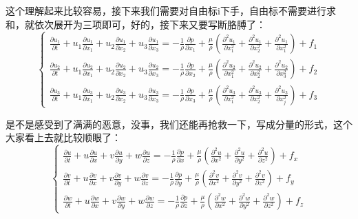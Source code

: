 \documentclass{ctexart}
\begin{document}
    \par
    这个理解起来比较容易，接下来我们需要对自由标i下手，自由标不需要进行求和，就依次展开为三项即可，好的，接下来又要写断胳膊了：
    $$
    \left\{\begin{array}{r}
    \frac{\partial u_{1}}{\partial t}+u_{1} \frac{\partial u_{1}}{\partial x_{1}}+u_{2} \frac{\partial u_{1}}{\partial x_{2}}+u_{3} \frac{\partial u_{1}}{\partial x_{3}}=-\frac{1}{\rho} \frac{\partial p}{\partial x_{1}}+\frac{\mu}{\rho}\left(\frac{\partial^{2} u_{1}}{\partial x_{1}^{2}}+\frac{\partial^{2} u_{1}}{\partial x_{2}^{2}}+\frac{\partial^{2} u_{1}}{\partial x_{1}^{2}}\right)+f_{1} \\
    \frac{\partial u_{2}}{\partial t}+u_{1} \frac{\partial u_{2}}{\partial x_{1}}+u_{2} \frac{\partial u_{2}}{\partial x_{2}}+u_{3} \frac{\partial u_{2}}{\partial x_{3}}=-\frac{1}{\rho} \frac{\partial p}{\partial x_{2}}+\frac{\mu}{\rho}\left(\frac{\partial^{2} u_{2}}{\partial x_{1}^{2}}+\frac{\partial^{2} u_{2}}{\partial x_{2}^{2}}+\frac{\partial^{2} u_{2}}{\partial x_{3}^{2}}\right)+f_{2} \\
    \frac{\partial u_{3}}{\partial t}+u_{1} \frac{\partial u_{3}}{\partial x_{1}}+u_{2} \frac{\partial u_{3}}{\partial x_{2}}+u_{3} \frac{\partial u_{3}}{\partial x_{3}}=-\frac{1}{\rho} \frac{\partial p}{\partial x_{3}}+\frac{\mu}{\rho}\left(\frac{\partial^{2} u_{3}}{\partial x_{1}^{2}}+\frac{\partial^{2} u_{3}}{\partial x_{2}^{2}}+\frac{\partial^{2} u_{3}}{\partial x_{j}^{2}}\right)+f_{3}
    \end{array}\right.
    $$
    \par
    是不是感受到了满满的恶意，没事，我们还能再抢救一下，写成分量的形式，这个大家看上去就比较顺眼了：
    $$
    \left\{\begin{array}{r}
    \frac{\partial u}{\partial t}+u \frac{\partial u}{\partial x}+v \frac{\partial u}{\partial y}+w \frac{\partial u}{\partial z}=-\frac{1}{\rho} \frac{\partial p}{\partial x}+\frac{\mu}{\rho}\left(\frac{\partial^{2} u}{\partial x^{2}}+\frac{\partial^{2} u}{\partial y^{2}}+\frac{\partial^{2} u}{\partial z^{2}}\right)+f_{x} \\
    \frac{\partial v}{\partial t}+u \frac{\partial v}{\partial x}+v \frac{\partial v}{\partial y}+w \frac{\partial v}{\partial z}=-\frac{1}{\rho} \frac{\partial p}{\partial y}+\frac{\mu}{\rho}\left(\frac{\partial^{2} v}{\partial x^{2}}+\frac{\partial^{2} v}{\partial y^{2}}+\frac{\partial^{2} v}{\partial z^{2}}\right)+f_{y} \\
    \frac{\partial w}{\partial t}+u \frac{\partial w}{\partial x}+v \frac{\partial w}{\partial y}+w \frac{\partial w}{\partial z}=-\frac{1}{\rho} \frac{\partial p}{\partial z}+\frac{\mu}{\rho}\left(\frac{\partial^{2} w}{\partial x^{2}}+\frac{\partial^{2} w}{\partial y^{2}}+\frac{\partial^{2} w}{\partial z^{2}}\right)+f_{z}
    \end{array}\right.
    $$
\end{document}

